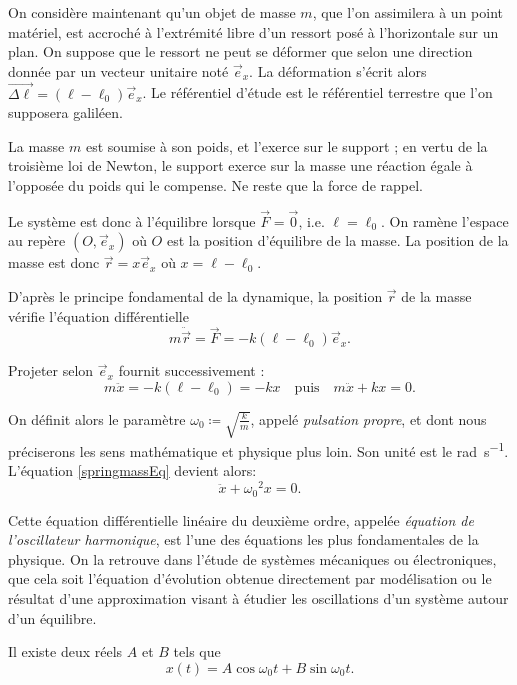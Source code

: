 \documentclass[../main]{subfiles}
\begin{document}
On considère maintenant qu'un objet de masse $m$, que l'on assimilera à un point matériel, est accroché à l'extrémité libre d'un ressort posé à l'horizontale sur un plan. On suppose que le ressort ne peut se déformer que selon une direction donnée par un vecteur unitaire noté $\vec{e}_x$. La déformation s'écrit alors $\vec{\Delta\ell}=(\ell-\ell_0)\vec{e}_x$. Le référentiel d'étude est le référentiel terrestre que l'on supposera galiléen. 

La masse $m$ est soumise à son poids, et l'exerce sur le support ; en vertu de la troisième loi de Newton, le support exerce sur la masse une réaction égale à l'opposée du poids qui le compense. Ne reste que la force de rappel.

Le système est donc à l'équilibre lorsque $\vec{F}=\vec{0}$, i.e. $\ell=\ell_0$. On ramène l'espace au repère $(O,\vec{e}_x)$ où $O$ est la position d'équilibre de la masse. La position de la masse est donc $\vec{r}=x\vec{e}_x$ où $x=\ell-\ell_0$.

D'après le principe fondamental de la dynamique, la position $\vec{r}$ de la masse vérifie l'équation différentielle
    \[
    m\ddot{\vec{r}} = \vec{F} = -k(\ell-\ell_0)\vec{e}_x.
    \]

Projeter selon $\vec{e}_x$ fournit successivement :
    \begin{equation}\label{springmassEq}
    m\ddot{x} = -k(\ell-\ell_0)=-kx
    \quad \text{puis}\quad m\ddot{x} + kx =0.
    \end{equation}

On définit alors le paramètre $\omega_0\coloneqq \sqrt{\frac{k}{m}}$, appelé \textit{pulsation propre}, et dont nous préciserons les sens mathématique et physique plus loin. Son unité est le \si{\radian\per\second}. L'équation \eqref{springmassEq} devient alors:
    \begin{equation}
        \ddot{x} + {\omega_0}^2x = 0.
    \end{equation}

Cette équation différentielle linéaire du deuxième ordre, appelée \textit{équation de l'oscillateur harmonique}, est l'une des équations les plus fondamentales de la physique. On la retrouve dans l'étude de systèmes mécaniques ou électroniques, que cela soit l'équation d'évolution obtenue directement par modélisation ou le résultat d'une approximation visant à étudier les oscillations d'un système autour d'un équilibre.

Il existe deux réels $A$ et $B$ tels que
	\begin{equation*}
	x(t) = A\cos\omega_0 t + B\sin\omega_0 t.
	\end{equation*}
\end{document}
